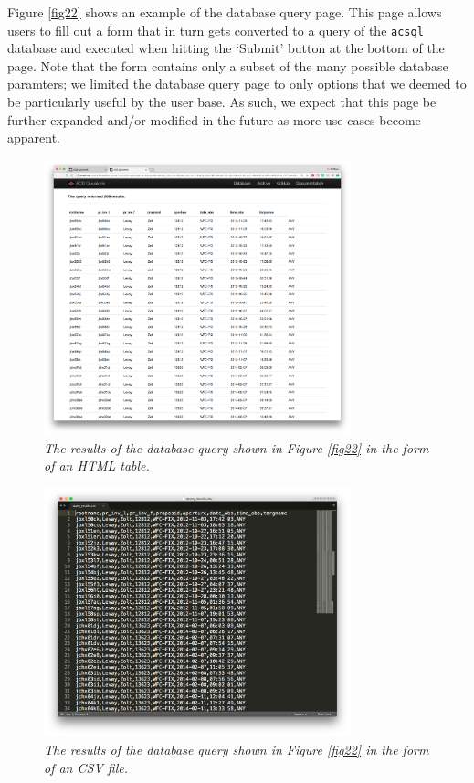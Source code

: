 \documentclass[10pt,journal,compsoc]{IEEEtran}
\begin{document}
Figure \ref{fig22} shows an example of the database query page.  This page allows users to fill out a form that in turn gets converted to a query of the \texttt{acsql} database and executed
when hitting the `Submit' button at the bottom of the page.  Note that the form contains only a subset of the many possible database paramters; we limited the database query page to only
options that we deemed to be particularly useful by the user base.  As such, we expect that this page be further expanded and/or modified in the future as more use cases become apparent.

\begin{figure}[!h]
\centering
\includegraphics[width=3.5in]{./figures/database_query_results_html.png}
\caption{\textit{The results of the database query shown in Figure \ref{fig22} in the form of an HTML table.}}
\label{fig23}
\end{figure}

\begin{figure}[!h]
\centering
\includegraphics[width=3.5in]{./figures/database_query_results_csv.png}
\caption{\textit{The results of the database query shown in Figure \ref{fig22} in the form of an CSV file.}}
\label{fig24}
\end{figure}
\end{document}
